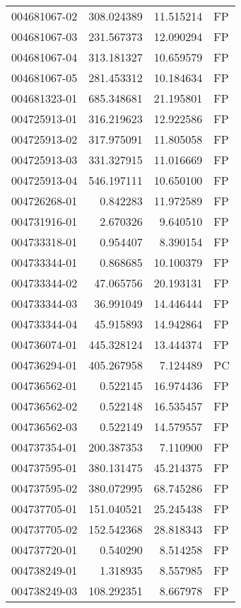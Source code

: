 \begin{tabular}{lrrl}
004681067-02 &  308.024389 &    11.515214 &   FP \\
004681067-03 &  231.567373 &    12.090294 &   FP \\
004681067-04 &  313.181327 &    10.659579 &   FP \\
004681067-05 &  281.453312 &    10.184634 &   FP \\
004681323-01 &  685.348681 &    21.195801 &   FP \\
004725913-01 &  316.219623 &    12.922586 &   FP \\
004725913-02 &  317.975091 &    11.805058 &   FP \\
004725913-03 &  331.327915 &    11.016669 &   FP \\
004725913-04 &  546.197111 &    10.650100 &   FP \\
004726268-01 &    0.842283 &    11.972589 &   FP \\
004731916-01 &    2.670326 &     9.640510 &   FP \\
004733318-01 &    0.954407 &     8.390154 &   FP \\
004733344-01 &    0.868685 &    10.100379 &   FP \\
004733344-02 &   47.065756 &    20.193131 &   FP \\
004733344-03 &   36.991049 &    14.446444 &   FP \\
004733344-04 &   45.915893 &    14.942864 &   FP \\
004736074-01 &  445.328124 &    13.444374 &   FP \\
004736294-01 &  405.267958 &     7.124489 &   PC \\
004736562-01 &    0.522145 &    16.974436 &   FP \\
004736562-02 &    0.522148 &    16.535457 &   FP \\
004736562-03 &    0.522149 &    14.579557 &   FP \\
004737354-01 &  200.387353 &     7.110900 &   FP \\
004737595-01 &  380.131475 &    45.214375 &   FP \\
004737595-02 &  380.072995 &    68.745286 &   FP \\
004737705-01 &  151.040521 &    25.245438 &   FP \\
004737705-02 &  152.542368 &    28.818343 &   FP \\
004737720-01 &    0.540290 &     8.514258 &   FP \\
004738249-01 &    1.318935 &     8.557985 &   FP \\
004738249-03 &  108.292351 &     8.667978 &   FP \\

\end{tabular}

